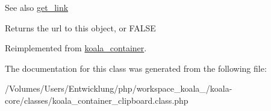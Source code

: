 \begin{DoxySeeAlso}{See also}
\hyperlink{classkoala__container_a4641893c4fc854ae033a888d68694601}{get\_\-link}
\end{DoxySeeAlso}
\begin{DoxyReturn}{Returns}
the url to this object, or FALSE 
\end{DoxyReturn}


Reimplemented from \hyperlink{classkoala__container_ae606ae88749a30baa3e1b42cece2c415}{koala\_\-container}.



The documentation for this class was generated from the following file:\begin{DoxyCompactItemize}
\item 
/Volumes/Users/Entwicklung/php/workspace\_\-koala\_/koala-\/core/classes/koala\_\-container\_\-clipboard.class.php\end{DoxyCompactItemize}

